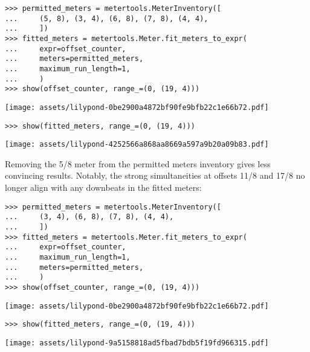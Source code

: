 \begin{singlespacing}
\vspace{-0.5\baselineskip}
\begin{lstlisting}
>>> permitted_meters = metertools.MeterInventory([
...     (5, 8), (3, 4), (6, 8), (7, 8), (4, 4),
...     ])
>>> fitted_meters = metertools.Meter.fit_meters_to_expr(
...     expr=offset_counter,
...     meters=permitted_meters,
...     maximum_run_length=1,
...     )
>>> show(offset_counter, range_=(0, (19, 4)))
\end{lstlisting}
\noindent\texttt{[image: assets/lilypond-0be2900a4872bf90fe9bfb22c1e66b72.pdf]}
\begin{lstlisting}
>>> show(fitted_meters, range_=(0, (19, 4)))
\end{lstlisting}
\noindent\texttt{[image: assets/lilypond-4252566a868aa8669a597a9b20a09b83.pdf]}
\end{singlespacing}

\noindent Removing the 5/8 meter from the permitted meters inventory gives less
convincing results. Notably, the strong simultaneities at offsets 11/8 and 17/8
no longer align with any downbeats in the fitted meters:

\begin{comment}
<abjad>
permitted_meters = metertools.MeterInventory([
    (3, 4), (6, 8), (7, 8), (4, 4),
    ])
fitted_meters = metertools.Meter.fit_meters_to_expr(
    expr=offset_counter,
    maximum_run_length=1,
    meters=permitted_meters,
    )
show(offset_counter, range_=(0, (19, 4)))
show(fitted_meters, range_=(0, (19, 4)))
</abjad>
\end{comment}

\begin{singlespacing}
\vspace{-0.5\baselineskip}
\begin{lstlisting}
>>> permitted_meters = metertools.MeterInventory([
...     (3, 4), (6, 8), (7, 8), (4, 4),
...     ])
>>> fitted_meters = metertools.Meter.fit_meters_to_expr(
...     expr=offset_counter,
...     maximum_run_length=1,
...     meters=permitted_meters,
...     )
>>> show(offset_counter, range_=(0, (19, 4)))
\end{lstlisting}
\noindent\texttt{[image: assets/lilypond-0be2900a4872bf90fe9bfb22c1e66b72.pdf]}
\begin{lstlisting}
>>> show(fitted_meters, range_=(0, (19, 4)))
\end{lstlisting}
\noindent\texttt{[image: assets/lilypond-9a5158818ad5fbad7bdb5f19fd966315.pdf]}
\end{singlespacing}

